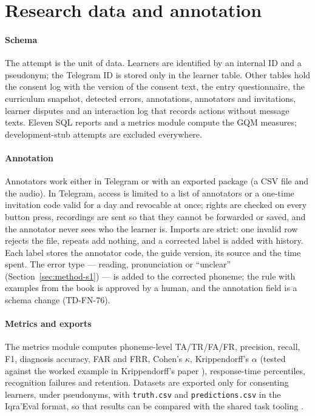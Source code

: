 \section{Research data and annotation}\label{sec:impl-data}

\paragraph{Schema} The attempt is the unit of data. Learners are identified by an internal ID and a pseudonym;
the Telegram ID is stored only in the learner table. Other tables hold the consent log with the version of
the consent text, the entry questionnaire, the curriculum snapshot, detected errors, annotations, annotators
and invitations, learner disputes and an interaction log that records actions without message texts.
Eleven SQL reports and a metrics module compute the GQM measures; development-stub attempts are excluded
everywhere.

\paragraph{Annotation} Annotators work either in Telegram or with an exported package (a CSV file and the
audio). In Telegram, access is limited to a list of annotators or a one-time invitation code valid for a day
and revocable at once; rights are checked on every button press, recordings are sent so that they cannot be
forwarded or saved, and the annotator never sees who the learner is. Imports are strict: one invalid row
rejects the file, repeats add nothing, and a corrected label is added with history. Each label stores the
annotator code, the guide version, its source and the time spent. The error type --- reading, pronunciation or
``unclear'' (Section~\ref{sec:method-s1}) --- is added to the corrected phoneme; the rule with examples from the
book is approved by a human, and the annotation field is a schema change (TD-FN-76).

\paragraph{Metrics and exports} The metrics module computes phoneme-level TA/TR/FA/FR, precision, recall, F1,
diagnosis accuracy, FAR and FRR, Cohen's $\kappa$, Krippendorff's $\alpha$ (tested against the worked example
in Krippendorff's paper \cite{SRC-065}), response-time percentiles, recognition failures and retention.
Datasets are exported only for consenting learners, under pseudonyms, with \texttt{truth.csv} and
\texttt{predictions.csv} in the Iqra'Eval format, so that results can be compared with the shared task
tooling \cite{SRC-066}.

